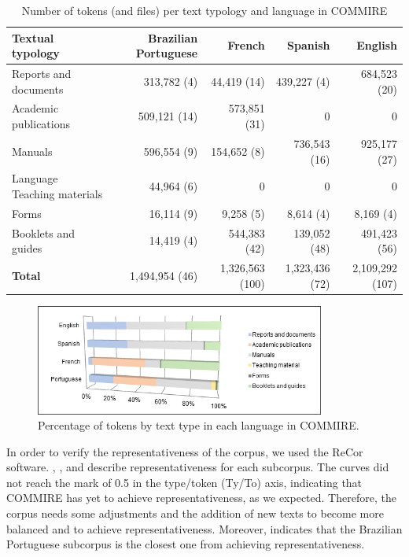 \documentclass[english]{textolivre}
\begin{document}
\begin{table}[htbp]
\caption{Number of tokens (and files) per text typology and language in COMMIRE}
\begin{tabular}{>{\raggedright}p{3cm}rrrr}
\toprule
Textual typology & \multicolumn{1}{p{2.8cm}}{Brazilian Portuguese} & French & Spanish & English \\
\midrule
Reports and documents & 313,782 (4) & 44,419 (14) & 439,227 (4) & 684,523 (20) \\
Academic publications & 509,121 (14) & 573,851 (31) & 0 &	0 \\
Manuals & 596,554 (9) & 154,652 (8) & 736,543 (16) &	925,177 (27) \\
Language Teaching materials	& 44,964 (6) & 0 &	0 &	0 \\
Forms &	16,114 (9) & 9,258 (5) & 8,614 (4) & 8,169 (4)\\
Booklets and guides & 14,419 (4) & 544,383 (42) &	139,052 (48) & 491,423 (56) \\
\textbf{Total} &	1,494,954 (46) & 1,326,563 (100) &	1,323,436 (72) &	2,109,292 (107) \\
\bottomrule
\end{tabular}
\label{Table05}
\end{table}

\begin{figure}[htbp]
\centering
\includegraphics[width=0.85\textwidth]{Figura05.png}
\caption{Percentage of tokens by text type in each language in COMMIRE.}
\label{Figura05}
\end{figure}

In order to verify the representativeness of the corpus, we used the ReCor \cite{seghiri_too_2014} software. , ,  and  describe representativeness for each subcorpus. The curves did not reach the mark of 0.5 in the type/token (Ty/To) axis, indicating that COMMIRE has yet to achieve representativeness, as we expected. Therefore, the corpus needs some adjustments and the addition of new texts to become more balanced and to achieve representativeness. Moreover,  indicates that the Brazilian Portuguese subcorpus is the closest one from achieving representativeness.
\end{document}

